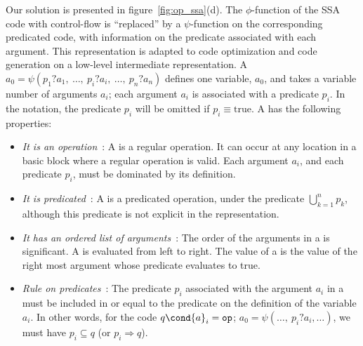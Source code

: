 Our solution is presented in figure~\ref{fig:op_ssa}(d). The $\phi$-function of the SSA code with control-flow
 is ``replaced'' by a $\psi$-function on the corresponding predicated code, with information on the
predicate associated with each argument. This representation is
adapted to code optimization and code generation on a low-level
intermediate representation.
%
A \psifun ${a_0 = \psi({p}_1?{a}_1,\ \dots,\ {p}_i?{a}_i,\
  \dots,\ {p}_n?{a}_n)}$ defines one variable, ${a_0}$,
and takes a variable number of arguments ${a_i}$; each
argument ${a_i}$ is associated with a predicate ${p_i}$. In
the notation, the predicate ${p_i}$ will be omitted if
${p_i} \equiv \textrm{true}$.
\newpage
A \psifun has the following properties:
\begin{itemize}

\item{\emph{It is an operation}}~: A \psifun is a regular operation. It
  can occur at any location in a basic block where a regular operation
  is valid. Each argument ${a_i}$, and each predicate ${p_i}$,
  must be dominated by its definition.

\item{\emph{It is predicated}}~: A \psifun is a predicated
  operation, under the predicate ${\bigcup_{k=1}^n p_k}$,
  although this predicate is not explicit in the representation.

\item{\emph{It has an ordered list of arguments}}~: The order of the
  arguments in a \psifun is significant. A \psifun is
  evaluated from left to right. The value of a \psifun is the
  value of the right most argument whose predicate evaluates to true.

\item{\emph{Rule on predicates}}~: The predicate ${p_i}$ associated
  with the argument ${a_i}$ in a \psifun must be included
  in or equal to the predicate on the definition of the variable ${a_i}$.
In other words, for the code $q\cond {a}_i = \texttt{op}$;  ${a}_0 = {\psi}(\dots,\ {p}_i?{a}_i,\dots)$, we must have 
${p}_i \subseteq {q}$ (or $p_i \Rightarrow q$).

\end{itemize}

